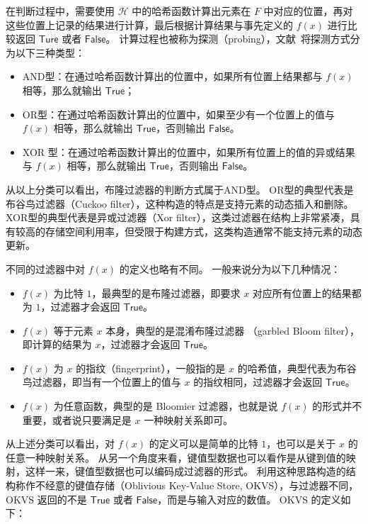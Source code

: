 在判断过程中，需要使用 $\mathcal{H}$ 中的哈希函数计算出元素在 $F$ 中对应的位置，再对这些位置上记录的结果进行计算，最后根据计算结果与事先定义的 $f(x)$ 进行比较返回 $\mathsf{Ture}$ 或者 $\mathsf{False}$。
计算过程也被称为探测（probing），文献~\cite{dillinger2021ribbon}将探测方式分为以下三种类型：
\begin{itemize}
    \item AND型：在通过哈希函数计算出的位置中，如果所有位置上结果都与 $f(x)$ 相等，那么就输出 $\mathsf{True}$；
    \item OR型：在通过哈希函数计算出的位置中，如果至少有一个位置上的值与 $f(x)$ 相等，那么就输出 $\mathsf{True}$，否则输出 $\mathsf{False}$。
    \item XOR 型：在通过哈希函数计算出的位置中，如果所有位置上的值的异或结果与 $f(x)$ 相等，那么就输出 $\mathsf{True}$，否则输出 $\mathsf{False}$。
\end{itemize}
从以上分类可以看出，布隆过滤器的判断方式属于AND型。
OR型的典型代表是布谷鸟过滤器（Cuckoo filter），这种构造的特点是支持元素的动态插入和删除。
XOR型的典型代表是异或过滤器（Xor filter），这类过滤器在结构上非常紧凑，具有较高的存储空间利用率，但受限于构建方式，这类构造通常不能支持元素的动态更新。

不同的过滤器中对 $f(x)$ 的定义也略有不同。
一般来说分为以下几种情况：
\begin{itemize}
    \item $f(x)$ 为比特 $1$，最典型的是布隆过滤器，即要求 $x$ 对应所有位置上的结果都为 $1$，过滤器才会返回 $\mathsf{True}$。
    \item $f(x)$ 等于元素 $x$ 本身，典型的是混淆布隆过滤器 （garbled Bloom filter），即计算的结果为 $x$，过滤器才会返回 $\mathsf{True}$。
    \item $f(x)$ 为 $x$ 的指纹（fingerprint），一般指的是 $x$ 的哈希值，典型代表为布谷鸟过滤器，即当有一个位置上的值与 $x$ 的指纹相同，过滤器才会返回 $\mathsf{True}$。
    \item $f(x)$ 为任意函数，典型的是 Bloomier 过滤器，也就是说 $f(x)$ 的形式并不重要，或者说只要满足是 $x$ 一种映射关系即可。
\end{itemize}

从上述分类可以看出，对 $f(x)$ 的定义可以是简单的比特 $1$，也可以是关于 $x$ 的任意一种映射关系。
从另一个角度来看，键值型数据也可以看作是从键到值的映射，这样一来，键值型数据也可以编码成过滤器的形式。
利用这种思路构造的结构称作不经意的键值存储（Oblivious Key-Value Store, OKVS），与过滤器不同，OKVS 返回的不是 $\mathsf{True}$ 或者 $\mathsf{False}$，而是与输入对应的数值。
OKVS 的定义如下：


